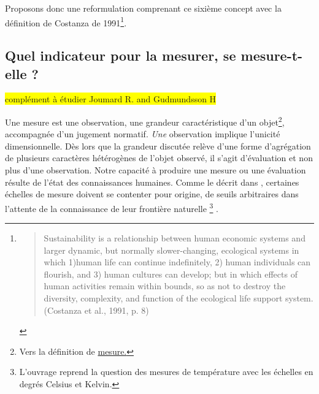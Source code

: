 
Proposons donc une reformulation comprenant ce sixième concept avec la définition de Costanza de 1991\footnote{\blockcquote[citation original pour éviter tout biais de traduction]{perman_natural_2009}{
Sustainability is a relationship between human economic systems and larger dynamic, but normally slower-changing, ecological systems in which 1)human life can continue indefinitely, 2) human individuals can flourish, and 3) human cultures can develop; but in which effects of human activities remain within bounds, so as not to destroy the diversity, complexity, and function of the ecological life support system. (Costanza et al., 1991, p. 8)
}}.

%
%

\subsection{Quel indicateur pour la mesurer, se mesure-t-elle ?}

\colorbox{yellow}{complément à étudier Joumard R. and Gudmundsson H}

Une mesure est une observation, une grandeur caractéristique d'un objet\footnote{Vers la définition de \href{http://www.cnrtl.fr/lexicographie/mesure}{mesure.}}, accompagnée d'un jugement normatif.
\emph{Une} observation implique l'unicité dimensionnelle.
Dès lors que la grandeur discutée relève d'une forme d'agrégation de plusieurs caractères hétérogènes de l'objet observé, il s'agit d'évaluation et non plus d'une observation.
Notre capacité à produire une mesure ou une évaluation résulte de l'état des connaissances humaines.
Comme le décrit \citeauthor{bouyssou_evaluation_2006} dans , certaines échelles de mesure doivent se contenter pour origine, de seuils arbitraires dans l'attente de la connaissance de leur frontière naturelle
\footnote{L'ouvrage reprend la question des mesures de température avec les échelles en degrés Celsius et Kelvin.}
\cite{bouyssou_evaluation_2006}.

